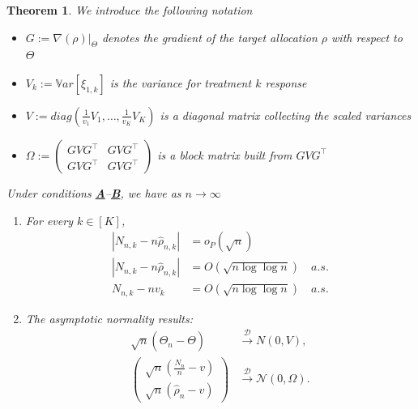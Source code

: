 \documentclass[11pt]{article}
\theoremstyle{plain}
\newtheorem{theorem}{Theorem}[section]
\theoremstyle{definition}
\begin{document}
\begin{theorem}\label{thm:normality-gen-erade}
	We introduce the following notation
	\begin{itemize}
		\item \(G := \nabla (\rho)\big|_{\Theta}\) denotes the gradient of the target allocation $\rho$ with respect to $\Theta$
		\item \(V_k := \mathbb{V}ar[\xi_{1,k}]\)  is the variance for treatment \(k\) response
		\item \(V := diag\left(\frac{1}{v_1}V_1, \dots, \frac{1}{v_K}V_K\right)\) is a diagonal matrix collecting the scaled variances
		\item \(\Omega := 
		\begin{pmatrix}
			GVG^{\top } & GVG^{\top } \\
			GVG^{\top } & GVG^{\top }
		\end{pmatrix}\) is a block matrix built from \(GVG^{\top }\)
	\end{itemize}
	Under conditions \hyperlink{CA}{\textbf{A}}--\hyperlink{CB}{\textbf{B}}, we have as \(n \to \infty\)
	
	\begin{enumerate}[label=(\roman*)]
		\item  For every \(k \in [K]\),
		\begin{align}
			|N_{n,k} - n\hat{\rho}_{n,k}| &= o_P(\sqrt{n})\label{eq:thm-res-1}\\
			|N_{n,k} - n\hat{\rho}_{n,k}| &= O(\sqrt{n \log\log n})\quad a.s.\label{eq:thm-res-2}\\
			N_{n,k}-n v_k&=O(\sqrt{n\log\log n})\quad a.s.\label{eq:thm-res-3}
		\end{align}
		\item The asymptotic normality results:
		\begin{align}\label{eq:thm-res-4}
			\sqrt{n}(\hat{\Theta}_n - \Theta) &\xrightarrow{\mathcal{D}} N(0,V),\\
			\label{eq:thm-res-5}
			\begin{pmatrix}
				\sqrt{n} \left( \frac{N_n}{n} - v \right)\\
				\sqrt{n} (\hat{\rho}_n - v)
			\end{pmatrix}
			&\xrightarrow{\mathcal{D}} \mathcal{N}(0,\Omega).
		\end{align}		
	\end{enumerate}
\end{theorem}
\end{document}
